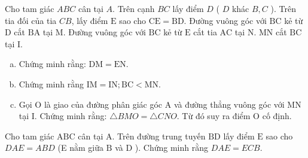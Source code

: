 \begin{bt}
	Cho tam giác $A B C$ cân tại $A$. Trên cạnh $B C$ lấy điểm $D$ ( $D$ khác $B, C$ ). Trên tia đối của tia $C B$, lấy điểm $\mathrm{E}$ sao cho $\mathrm{CE}=\mathrm{BD}$. Đường vuông góc với $\mathrm{BC}$ kẻ từ $\mathrm{D}$ cắt $\mathrm{BA}$ tại $\mathrm{M}$. Đường vuông góc với $\mathrm{BC}$ kẻ từ $\mathrm{E}$ cắt tia $\mathrm{AC}$ tại $\mathrm{N}$. $\mathrm{MN}$ cắt $\mathrm{BC}$ tại $\mathrm{I}$.
	\begin{enumerate}[a.]
		\item Chứng minh rằng: $\mathrm{DM}=\mathrm{EN}$.
        \item Chứng minh rằng $\mathrm{IM}=\mathrm{IN} ; \mathrm{BC}<\mathrm{MN}$.
        \item Gọi $\mathrm{O}$ là giao của đường phân giác góc $\mathrm{A}$ và đường thẳng vuông góc với $\mathrm{MN}$ tại $\mathrm{I}$. Chứng minh rằng: $\triangle B M O=\triangle C N O$. Từ đó suy ra điểm $\mathrm{O}$ cố định.
	\end{enumerate}
	\loigiai{}
\end{bt}

\begin{bt}
Cho tam giác $\mathrm{ABC}$ cân tại $\mathrm{A}$. Trên đường trung tuyến $\mathrm{BD}$ lấy điểm $\mathrm{E}$ sao cho $D A E=A B D$ (E nằm giữa $\mathrm{B}$ và $\mathrm{D}$ ). Chứng minh rằng $D A E=E C B$.
\loigiai{}
\end{bt}